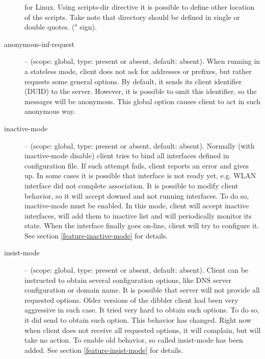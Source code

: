 \begin{description}
            for Linux. Using scripts-dir directive it is possible to
            define other location of the scripts. Take note that
            directory should be defined in single or double quotes.
            (" sign).
\item[anonymous-inf-request] -- (scope: global, type: present or absent,
            default: absent). When running in a stateless mode, client
            does not ask for addresses or prefixes, but rather
            requests some general options. By default, it sends its
            client identifier (DUID) to the server. However, it is
            possible to omit this identifier, so the 
            messages will be anonymous. This global option causes
            client to act in such anonymous way.
 \item[inactive-mode] -- (scope: global, type: present or absent,
            default: absent). Normally (with inactive-mode disable)
            client tries to bind all interfaces defined in
            configuration file. If such attempt fails, client reports
            an error and gives up. In some cases it is possible that
            interface is not ready yet, e.g. WLAN interface did not
            complete association. It is possible to modify client
            behavior, so it will accept downed and not running
            interfaces. To do so, inactive-mode must be enabled. In
            this mode, client will accept inactive interfaces, will
            add them to inactive list and will periodically monitor
            its state. When the interface finally goes on-line, client
            will try to configure it. See section
            \ref{feature-inactive-mode} for details.
 \item[insist-mode] -- (scope: global, type: present or absent,
            default: absent). Client can be instructed to obtain
            several configuration options, like DNS server
            configuration or domain name. It is possible that server
            will not provide all requested options. Older versions of
            the dibbler client had been very aggressive in such
            case. It tried very hard to obtain such options. To do so,
            it did send  to obtain such option. This
            behavior has changed. Right now when client does not
            receive all requested options, it will complain, but will
            take no action. To enable old behavior, so called
            insist-mode has been added. See section
            \ref{feature-insist-mode} for details.

\end{description}
